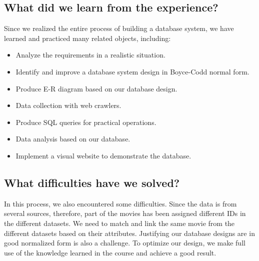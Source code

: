 \documentclass[a4paper]{article}
\begin{document}
  \subsection{What did we learn from the experience?}
  Since we realized the entire process of building a database system, we have learned and practiced many related objects, including:
  \begin{itemize}
    \item Analyze the requirements in a realistic situation.
    \item Identify and improve a database system design in Boyce-Codd normal form.
    \item Produce E-R diagram based on our database design.
    \item Data collection with web crawlers.
    \item Produce SQL queries for practical operations.
    \item Data analysis based on our database.
    \item Implement a visual website to demonstrate the database.
  \end{itemize}
  \subsection{What difficulties have we solved?}
    In this process, we also encountered some difficulties. Since the data is from several sources, therefore, part of the movies has been assigned different IDs in the different datasets. We need to match and link the same movie from the different datasets based on their attributes. Justifying our database designs are in good normalized form is also a challenge. To optimize our design, we make full use of the knowledge learned in the course and achieve a good result.
\end{document}
